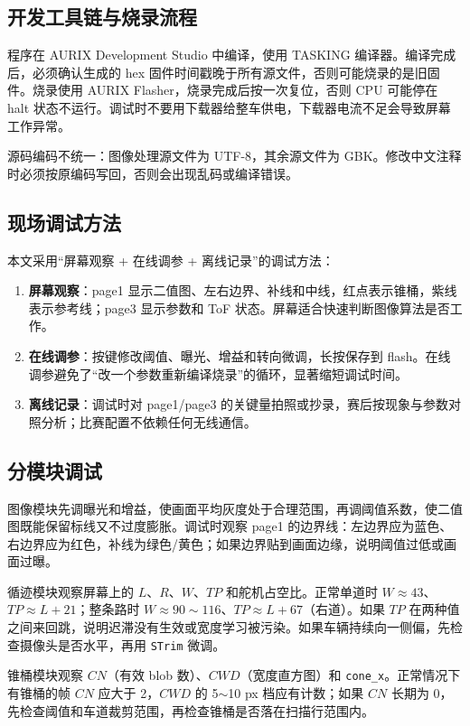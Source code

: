 \documentclass{MaiTechReport}
\begin{document}
\subsection{开发工具链与烧录流程}
程序在 AURIX Development Studio 中编译，使用 TASKING 编译器。编译完成后，必须确认生成的 hex 固件时间戳晚于所有源文件，否则可能烧录的是旧固件。烧录使用 AURIX Flasher，烧录完成后按一次复位，否则 CPU 可能停在 halt 状态不运行。调试时不要用下载器给整车供电，下载器电流不足会导致屏幕工作异常。

源码编码不统一：图像处理源文件为 UTF-8，其余源文件为 GBK。修改中文注释时必须按原编码写回，否则会出现乱码或编译错误。

\subsection{现场调试方法}
本文采用“屏幕观察 + 在线调参 + 离线记录”的调试方法：
\begin{enumerate}
  \item \textbf{屏幕观察}：page1 显示二值图、左右边界、补线和中线，红点表示锥桶，紫线表示参考线；page3 显示参数和 ToF 状态。屏幕适合快速判断图像算法是否工作。
  \item \textbf{在线调参}：按键修改阈值、曝光、增益和转向微调，长按保存到 flash。在线调参避免了“改一个参数重新编译烧录”的循环，显著缩短调试时间。
  \item \textbf{离线记录}：调试时对 page1/page3 的关键量拍照或抄录，赛后按现象与参数对照分析；比赛配置不依赖任何无线通信。
\end{enumerate}

\subsection{分模块调试}
图像模块先调曝光和增益，使画面平均灰度处于合理范围，再调阈值系数，使二值图既能保留标线又不过度膨胀。调试时观察 page1 的边界线：左边界应为蓝色、右边界应为红色，补线为绿色/黄色；如果边界贴到画面边缘，说明阈值过低或画面过曝。

循迹模块观察屏幕上的 $L$、$R$、$W$、$TP$ 和舵机占空比。正常单道时 $W\approx43$、$TP\approx L+21$；整条路时 $W\approx90\sim116$、$TP\approx L+67$（右道）。如果 $TP$ 在两种值之间来回跳，说明迟滞没有生效或宽度学习被污染。如果车辆持续向一侧偏，先检查摄像头是否水平，再用 \texttt{STrim} 微调。

锥桶模块观察 $CN$（有效 blob 数）、$CWD$（宽度直方图）和 \texttt{cone\_x}。正常情况下有锥桶的帧 $CN$ 应大于 2，$CWD$ 的 5$\sim$10 px 档应有计数；如果 $CN$ 长期为 0，先检查阈值和车道裁剪范围，再检查锥桶是否落在扫描行范围内。
\end{document}
